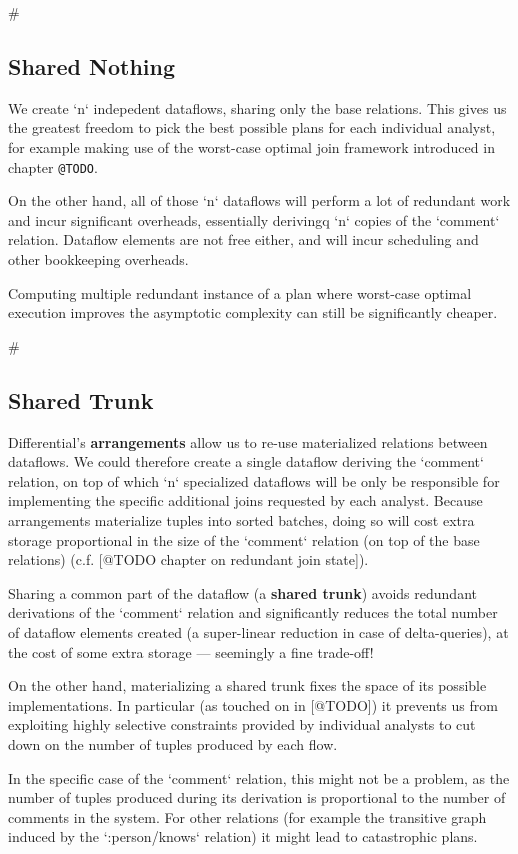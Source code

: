 \documentclass[../catalog.tex]{subfiles}
\begin{document}
\#\subsection{Shared Nothing}

We create `n` indepedent dataflows, sharing only the base
relations. This gives us the greatest freedom to pick the best
possible plans for each individual analyst, for example making use of
the worst-case optimal join framework introduced in chapter \texttt{@TODO}.

On the other hand, all of those `n` dataflows will perform a lot of
redundant work and incur significant overheads, essentially
derivingq `n` copies of the `comment` relation. Dataflow elements
are not free either, and will incur scheduling and other bookkeeping
overheads.

Computing multiple redundant instance of a plan where worst-case
optimal execution improves the asymptotic complexity can still be
significantly cheaper.

\#\subsection{Shared Trunk}

Differential's \textbf{arrangements} allow us to re-use materialized
relations between dataflows. We could therefore create a single
dataflow deriving the `comment` relation, on top of which `n`
specialized dataflows will be only be responsible for implementing the
specific additional joins requested by each analyst. Because
arrangements materialize tuples into sorted batches, doing so will
cost extra storage proportional in the size of the `comment` relation
(on top of the base relations) (c.f. [@TODO chapter on redundant join
state]).

Sharing a common part of the dataflow (a \textbf{shared trunk}) avoids
redundant derivations of the `comment` relation and significantly
reduces the total number of dataflow elements created (a super-linear
reduction in case of delta-queries), at the cost of some extra storage
— seemingly a fine trade-off!

On the other hand, materializing a shared trunk fixes the space of its
possible implementations. In particular (as touched on in [@TODO]) it
prevents us from exploiting highly selective constraints provided by
individual analysts to cut down on the number of tuples produced by
each flow.

In the specific case of the `comment` relation, this might not be a
problem, as the number of tuples produced during its derivation is
proportional to the number of comments in the system. For other
relations (for example the transitive graph induced by the
`:person/knows` relation) it might lead to catastrophic plans.
\end{document}
